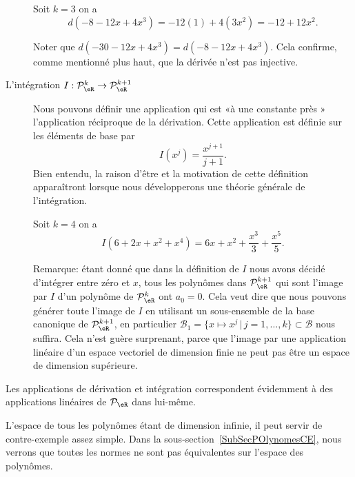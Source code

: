 \begin{description}
	      \begin{example} Soit \( k=3\) on a
		      \begin{equation}
			      d(-8-12x+4x^3)= -12 (1) + 4 (3x^2) = -12+12 x^2.
		      \end{equation}

		      Noter que \( d(-30-12x+4x^3)=d(-8-12x+4x^3)\). Cela confirme, comme mentionné plus haut, que la dérivée n'est pas injective.
	      \end{example}
	\item[L'intégration \( I: \mathcal{P}_\eR^k \to \mathcal{P}_\eR^{k+1}\)] Nous pouvons définir une application qui est «à une constante près » l'application réciproque de la dérivation. Cette application est définie sur les éléments de base par
	      \begin{equation}
		      I(x^j)= \frac{x^{j+1}}{j+1}.
	      \end{equation}
	      Bien entendu, la raison d'être et la motivation de cette définition apparaîtront lorsque nous développerons une théorie générale de l'intégration.

	      \begin{example}
		      Soit \( k=4\) on a
		      \begin{equation}
			      I(6+2x+x^2+x^4)= 6x+x^2+\frac{x^3}{3}+\frac{x^5}{5}.
		      \end{equation}
	      \end{example}

	      Remarque: étant donné que dans la définition de \( I\) nous avons décidé d'intégrer entre zéro et \( x\), tous les polynômes dans \( \mathcal{P}_\eR^{k+1}\) qui sont l'image par \( I\) d'un polynôme de \( \mathcal{P}_\eR^{k}\) ont \( a_0=0\). Cela veut dire que nous pouvons générer toute l'image de \( I\) en utilisant un sous-ensemble de la base canonique de \( \mathcal{P}_\eR^{k+1}\), en particulier \( \mathcal{B}_1=\{x\mapsto x^j \,|\, j=1, \ldots, k\}\subset \mathcal{B}\) nous suffira. Cela n'est guère surprenant, parce que l'image par une application linéaire d'un espace vectoriel de dimension finie ne peut pas être un espace de dimension supérieure.
\end{description}

Les applications de dérivation et intégration correspondent évidemment à des applications linéaires de \( \mathcal{P}_\eR\) dans lui-même.

L'espace de tous les polynômes étant de dimension infinie, il peut servir de contre-exemple assez simple. Dans la sous-section~\ref{SubSecPOlynomesCE}, nous verrons que toutes les normes ne sont pas équivalentes sur l'espace des polynômes.

